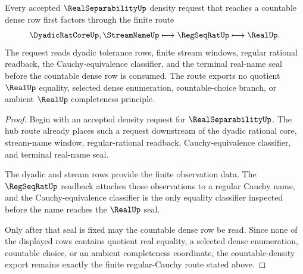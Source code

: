 \begin{theorem}
\label{thm:real-separability-regular-cauchy-dense-countable-route}
Every accepted $\RealSeparabilityUp$ density request that reaches a countable dense row first factors through the finite route
$$
\DyadicRatCoreUp,\StreamNameUp \longmapsto \RegSeqRatUp \longmapsto \RealUp .
$$
The request reads dyadic tolerance rows, finite stream windows, regular rational readback, the Cauchy-equivalence classifier, and the terminal real-name seal before the countable dense row is consumed. The route exports no quotient $\RealUp$ equality, selected dense enumeration, countable-choice branch, or ambient $\RealUp$ completeness principle.
\end{theorem}
\begin{proof}
Begin with an accepted density request for $\RealSeparabilityUp$. The hub route already places such a request downstream of the dyadic rational core, stream-name window, regular-rational readback, Cauchy-equivalence classifier, and terminal real-name seal.

The dyadic and stream rows provide the finite observation data. The $\RegSeqRatUp$ readback attaches those observations to a regular Cauchy name, and the Cauchy-equivalence classifier is the only equality classifier inspected before the name reaches the $\RealUp$ seal.

Only after that seal is fixed may the countable dense row be read. Since none of the displayed rows contains quotient real equality, a selected dense enumeration, countable choice, or an ambient completeness coordinate, the countable-density export remains exactly the finite regular-Cauchy route stated above.
\end{proof}
